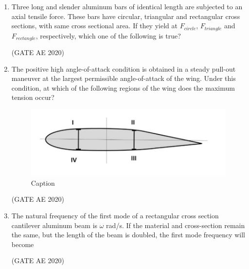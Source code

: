 \documentclass[journal,12pt,onecolumn]{IEEEtran}
\theoremstyle{remark}
\begin{document}
\begin{enumerate}
\item Three long and slender aluminum bars of identical length are subjected to an axial tensile force. These bars have circular, triangular and rectangular cross sections, with same cross sectional area. If they yield at $F_{circle}$, $F_{triangle}$ and $F_{rectangle}$, respectively, which one of the following is true?
\begin{enumerate}
\end{enumerate}
\hfill(GATE AE 2020)

\item The positive high angle-of-attack condition is obtained in a steady pull-out maneuver at the largest permissible angle-of-attack of the wing. Under this condition, at which of the following regions of the wing does the maximum tension occur?
   \begin{figure}[H]
       \centering
       \includegraphics[width=0.5\columnwidth]{figs/Screenshot from 2025-08-18 15-24-29.png}
       \caption{Caption}
       \label{fig:placeholder}
   \end{figure}
\begin{enumerate}
\end{enumerate}
\hfill(GATE AE 2020)

\item The natural frequency of the first mode of a rectangular cross section cantilever aluminum beam is $\omega$ rad/s. If the material and cross-section remain the same, but the length of the beam is doubled, the first mode frequency will become
\begin{enumerate}
\end{enumerate}
\hfill(GATE AE 2020)


\end{enumerate}
\end{document}
